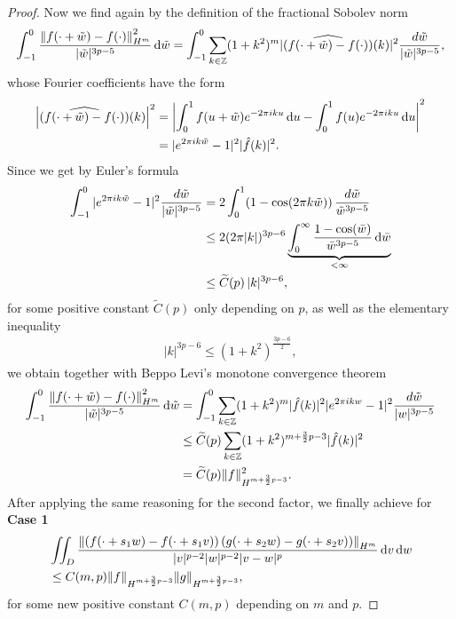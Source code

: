 \begin{proof}
	Now we find again by the definition of the fractional Sobolev norm 
	\begin{align*}
	\int_{-1}^{0} \frac{ \left\|  f(\cdot+\tilde{w}) - f(\cdot)\right\|^2_{H^m}}{|\tilde{w}|^{3p-5}} \,\mathrm{d} \tilde{w} = \int_{-1}^{0} \sum_{k\in\mathbb{Z}} (1+k^2)^m |(\widehat{f(\cdot+\tilde{w}) - f(\cdot)})(k)|^2 \frac{d \tilde{w}}{|\tilde{w}|^{3p-5}},
	\end{align*}
	whose Fourier coefficients have the form
	\begin{align*}
	\left|(\widehat{f(\cdot+\tilde{w}) - f(\cdot)})(k)\right|^2 & =  \left|\int_0^1 f(u+\tilde{w}) e^{-2\pi i k u} \,\mathrm{d} u  - \int_0^1 f(u) e^{-2\pi i k u} \,\mathrm{d} u\right|^2 \\
	& = |e^{2\pi i k \tilde{w}} - 1|^2  | \hat{f}(k)|^2. 
	\end{align*}
	Since we get by Euler's formula 
	\begin{align} \label{eq:orderk}
	\begin{split}
	\int_{-1}^{0} |e^{2\pi i k \tilde{w}} - 1|^2  \frac{d \tilde{w}}{|\tilde{w}|^{3p-5}} & = 2 \int_0^1 (1-\cos(2\pi k\tilde{w}) ) \, \frac{d \tilde{w}}{\tilde{w}^{3p-5}} \\
	& \leq 2 (2\pi |k|)^{3p-6} \underbrace{\int_0^\infty \frac{1-\cos(\bar{w})}{\bar{w}^{3p-5}} \,\mathrm{d} \bar{w}}_{<\infty} \\
	& \leq \widetilde C(p)\,  |k|^{3p-6}, 
	\end{split}
	\end{align}
	for some positive constant $\widetilde C(p)$ only depending on $p$, 
	as well as  the elementary inequality 
	\begin{align}\label{eq:elementariest}
	|k|^{3p-6} \leq (1+k^2)^{\frac{3p-6}{2}}, 
	\end{align}
	we obtain together with Beppo Levi's monotone convergence theorem
	\begin{align*}
	\int_{-1}^{0} \frac{ \left\|  f(\cdot+\tilde{w}) - f(\cdot)\right\|^2_{H^m}}{|\tilde{w}|^{3p-5}} \,\mathrm{d} \tilde{w} & = \int_{-1}^{0} \sum_{k\in\mathbb{Z}} (1+k^2)^m | \hat{f}(k)|^2   |e^{2\pi i k w} - 1|^2\frac{d \tilde{w}}{|w|^{3p-5}} \\
	& \leq \widetilde C(p)  \sum_{k\in\mathbb{Z}} (1+k^2)^{m+\frac 32 p -3} | \hat{f}(k)|^2 \\
	& = \widetilde C(p) \|f\|_{H^{m+\frac 32 p -3}}^2. 
	\end{align*}
	After applying the same reasoning for the second factor, we finally achieve for \textbf{Case 1}
	\begin{align*}
	& \iint_D   \frac{ \left\| \left(f(\cdot+s_1w) - f(\cdot+s_1v) \right) \left(g(\cdot+s_2w) - g(\cdot+s_2v) \right) \right\|_{H^m}}{|v|^{p-2}|w|^{p-2}|v-w|^{p}}  \,\mathrm{d} v \,\mathrm{d} w \\
	& \leq C(m,p) \|f\|_{H^{m+\frac 32 p -3}} \|g\|_{H^{m+\frac 32 p -3}},
	\end{align*}
	for some new positive constant $C(m,p)$ depending on $m$ and $p$.


\end{proof}
